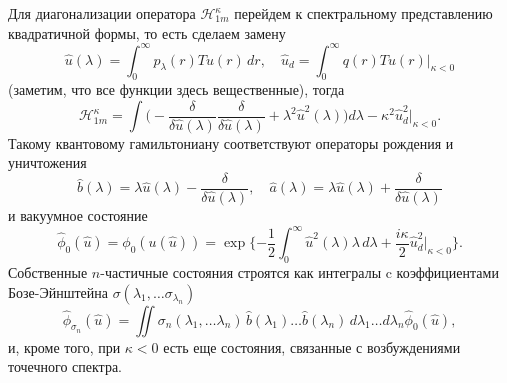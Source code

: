 \documentclass[12pt]{article}
\newcommand{\HH}{\mathscr{H}}
\begin{document}
    Для диагонализации оператора
$ \HH_{1m}^{\kappa} $
    перейдем к спектральному представлению квадратичной формы, то есть сделаем
    замену
\begin{equation*}
    \hat{u}(\lambda) = \int_{0}^{\infty} p_{\lambda}(r) T u(r)\,dr, \quad
	\hat{u}_{d} =  \int_{0}^{\infty} q(r) T u(r) \bigr|_{\kappa<0}
\end{equation*}
    (заметим, что все функции здесь вещественные), тогда
\begin{equation*}
    \HH_{1m}^{\kappa} = \int \bigl(
-\frac{\delta}{\delta \hat{u}(\lambda)} \frac{\delta}{\delta \hat{u}(\lambda)}
	+ \lambda^{2} \hat{u}^{2}(\lambda) \bigr)d\lambda
	- \kappa^{2} \hat{u}_{d}^{2} \bigr|_{\kappa <0} .
\end{equation*}
    Такому квантовому гамильтониану соответствуют операторы рождения
    и уничтожения
\begin{equation*}
    \hat{b}(\lambda) = \lambda \hat{u}(\lambda)
	- \frac{\delta}{\delta \hat{u}(\lambda)} ,\quad
    \hat{a}(\lambda) = \lambda \hat{u}(\lambda) 
	+ \frac{\delta}{\delta \hat{u}(\lambda)}
\end{equation*}
    и вакуумное состояние
\begin{equation*}
    \hat{\phi}_{0}(\hat{u}) = \phi_{0}(u(\hat{u})) = \exp\{-\frac{1}{2}
	\int_{0}^{\infty} \hat{u}^{2}(\lambda) \lambda \,d\lambda
	+\frac{i\kappa}{2} \hat{u}_{d}^{2} \bigr|_{\kappa < 0}\} .
\end{equation*}
    Собственные 
$ n $-частичные
    состояния строятся как интегралы c коэффициентами Бозе-Эйнштейна
$ \sigma(\lambda_{1},\ldots \sigma_{\lambda_{n}}) $
\begin{equation}
\label{hatphi}
    \hat{\phi}_{\sigma_{n}}(\hat{u}) = \iint
    \sigma_{n} (\lambda_{1},\ldots \lambda_{n}) \,
	\hat{b}(\lambda_{1}) \ldots \hat{b}(\lambda_{n}) \,
    d\lambda_{1} \ldots d\lambda_{n} \hat{\phi}_{0}(\hat{u}) ,
\end{equation}
    и, кроме того, при
$ \kappa < 0 $
    есть еще состояния, связанные с возбуждениями точечного спектра.
\end{document}
